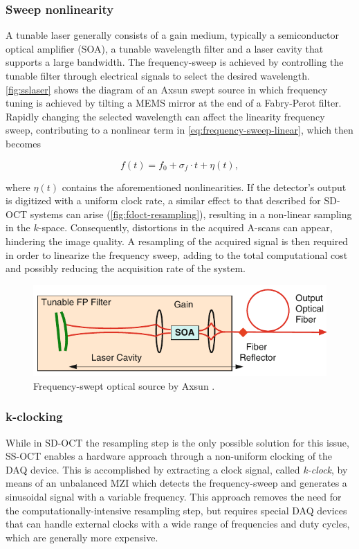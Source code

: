 \subsubsection{Sweep nonlinearity}
A tunable laser generally consists of a gain medium, typically a semiconductor optical amplifier (\acs{SOA}), a tunable wavelength filter and a laser cavity that supports a large bandwidth. The frequency-sweep is achieved by controlling the tunable filter through electrical signals to select the desired wavelength. \autoref{fig:sslaser} shows the diagram of an Axsun swept source in which frequency tuning is achieved by tilting a \ac{MEMS} mirror at the end of a Fabry-Perot filter. Rapidly changing the selected wavelength can affect the linearity frequency sweep, contributing to a nonlinear term in \autoref{eq:frequency-sweep-linear}, which then becomes

\begin{equation}
	f(t) = f_0 + \sigma_f \cdot t + \eta (t),
\end{equation}

where $\eta(t)$ contains the aforementioned nonlinearities. If the detector's output is digitized with a uniform clock rate, a similar effect to that described for \ac{SD-OCT} systems can arise (\autoref{fig:fdoct-resampling}), resulting in a non-linear sampling in the $k$-space. Consequently, distortions in the acquired A-scans can appear, hindering the image quality. A resampling of the acquired signal is then required in order to linearize the frequency sweep, adding to the total computational cost and possibly reducing the acquisition rate of the system. 


\begin{figure}[hbt]
	\myfloatalign
	\includegraphics[width=0.7\linewidth]{gfx/ch2/sslaser}
	\caption{Frequency-swept optical source by Axsun \cite{Drexler2015}.}\label{fig:sslaser}
\end{figure}

\subsubsection{k-clocking}

While in \ac{SD-OCT} the resampling step is the only possible solution for this issue, \ac{SS-OCT} enables a hardware approach through a non-uniform clocking of the \ac{DAQ} device. This is accomplished by extracting a clock signal, called \emph{k-clock}, by means of an unbalanced \acf{MZI} which detects the frequency-sweep and generates a sinusoidal signal with a variable frequency. This approach removes the need for the computationally-intensive resampling step, but requires special \ac{DAQ} devices that can handle external clocks with a wide range of frequencies and duty cycles, which are generally more expensive.  

